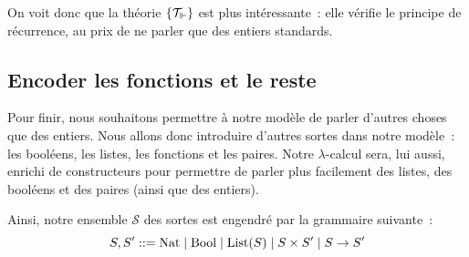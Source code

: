 \documentclass{article}
\begin{document}
On voit donc que la théorie $\{\mathcal T_\Vdash\}$ est plus intéressante~: elle vérifie le principe de récurrence, au prix de ne parler que des entiers standards.

\subsection{Encoder les fonctions et le reste}

Pour finir, nous souhaitons permettre à notre modèle de parler d'autres choses que des entiers. Nous allons donc introduire d'autres sortes dans notre modèle~: les booléens, les listes, les fonctions et les paires. Notre $\lambda$-calcul sera, lui aussi, enrichi de constructeurs pour permettre de parler plus facilement des listes, des booléens et des paires (ainsi que des entiers).

Ainsi, notre ensemble $\mathcal S$ des sortes est engendré par la grammaire suivante~:
\[S,S' ::= \mathrm{Nat}\mid\mathrm{Bool}\mid\mathrm{List}(S)\mid S\times S'\mid S\to S'\]
\end{document}
